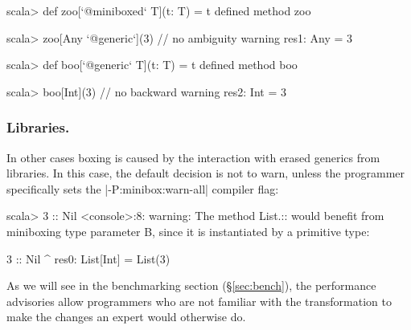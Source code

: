 \begin{lstlisting-nobreak}
 scala> def zoo[`@miniboxed` T](t: T) = t
 defined method zoo

 scala> zoo[Any `@generic`](3) // no ambiguity warning
 res1: Any = 3

 scala> def boo[`@generic` T](t: T) = t
 defined method boo

 scala> boo[Int](3)                   // no backward warning
 res2: Int = 3
\end{lstlisting-nobreak}

\vspace{-0.5em}

\subsubsection{Libraries.} In other cases boxing is caused by the interaction with erased generics from libraries. In this case, the default decision is not to warn, unless the programmer specifically sets the |-P:minibox:warn-all| compiler flag:

\begin{lstlisting-nobreak}
 scala> 3 :: Nil
 <console>:8: warning: The method List.:: would benefit from miniboxing type parameter B, since it is instantiated by a primitive type:

               3 :: Nil
                 ^
 res0: List[Int] = List(3)
\end{lstlisting-nobreak}

As we will see in the benchmarking section (\S\ref{sec:bench}), the performance advisories allow programmers who are not familiar with the transformation to make the changes an expert would otherwise do.

